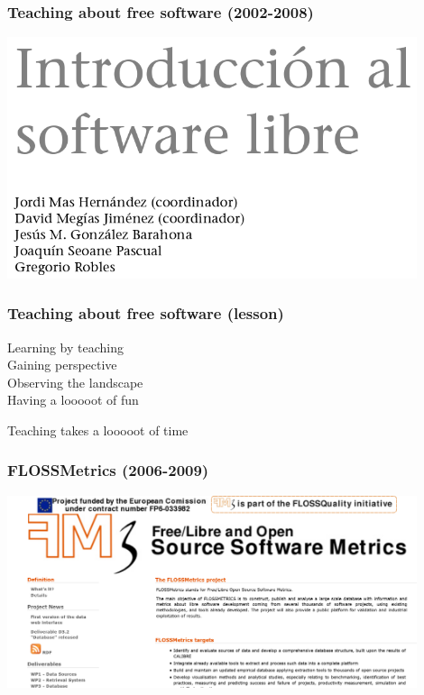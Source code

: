 \documentclass[17pt,aspectratio=169,hyperref=pdfusetitle]{beamer}
\begin{document}
\begin{frame}[fragile]
  \frametitle{Teaching about free software (2002-2008)}
  
  \begin{center}
  \includegraphics[width=12cm]{figs/intro-sobre}
  \end{center}  
  
\end{frame}

\begin{frame}[fragile]
  \frametitle{Teaching about free software (lesson)}
  
  Learning by teaching \\
  Gaining perspective \\
  Observing the landscape \\
  Having a looooot of fun \\
  
  \begin{center}
    Teaching takes a looooot of time
  \end{center}  
  
\end{frame}

\begin{frame}[fragile]
  \frametitle{FLOSSMetrics (2006-2009)}

  \begin{center}
  \includegraphics[width=12cm]{figs/flossmetrics}
  \end{center}  
  
\end{frame}
\end{document}
